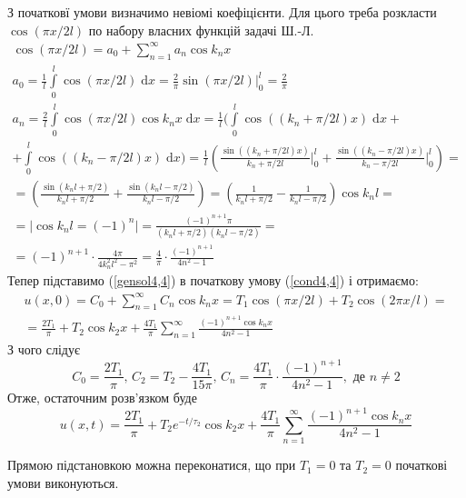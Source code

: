 З початковї умови визначимо невіомі коефіцієнти. Для цього треба розкласти $\cos(\pi x/2l)$ по набору власних функцій задачі Ш.-Л. 
\begin{equation*}
    \begin{gathered}
        \cos(\pi x/2l) = a_0 + \sum_{n=1}^{\infty} a_n \cos k_nx \\
        a_0 = \frac{1}{l}\int\limits_0^l \cos(\pi x/2l) \;\mathrm{d}x = \frac{2}{\pi} \sin(\pi x/2l) \bigg|_0^l = \frac{2}{\pi}\\
        a_n = \frac{2}{l}\int\limits_0^l \cos(\pi x/2l)\cos k_nx \;\mathrm{d}x = \frac{1}{l}\bigg(\int\limits_0^l \cos((k_n + \pi/2l)x) \;\mathrm{d}x +\\
        + \int\limits_0^l \cos((k_n - \pi/2l)x) \;\mathrm{d}x\bigg) = \frac{1}{l}\left(\frac{\sin((k_n + \pi/2l)x)}{k_n + \pi/2l}\bigg|_0^l + \frac{\sin((k_n - \pi/2l)x)}{k_n - \pi/2l}\bigg|_0^l\right) =\\
        = \left(\frac{\sin(k_nl + \pi/2)}{k_nl + \pi/2} + \frac{\sin(k_nl - \pi/2)}{k_nl - \pi/2}\right) = \left(\frac{1}{k_nl + \pi/2} - \frac{1}{k_nl - \pi/2}\right)\cos k_nl =\\
        = \big|\cos k_nl = (-1)^n\big| = \frac{(-1)^{n+1} \pi}{(k_nl + \pi/2)(k_nl - \pi/2)} =\\
        = (-1)^{n+1} \cdot \frac{4\pi}{4k_n^2l^2 - \pi^2} = \frac{4}{\pi} \cdot \frac{(-1)^{n+1}}{4n^2 - 1}
    \end{gathered}
\end{equation*}
Тепер підставимо (\ref{gensol4,4}) в початкову умову (\ref{cond4,4}) і отримаємо:
\begin{equation}
    \begin{gathered}
        u(x,0) = C_0 + \sum_{n=1}^{\infty}C_n \cos k_n x = T_1 \cos(\pi x/2l) + T_2 \cos(2\pi x/l) =\\
        = \frac{2T_1}{\pi} + T_2 \cos k_2x + \frac{4T_1}{\pi} \sum_{n=1}^{\infty} \frac{(-1)^{n+1} \cos k_nx}{4n^2 - 1}
    \end{gathered}
\end{equation} 
З чого слідує 
\begin{equation*}
    C_0 = \frac{2T_1}{\pi},\, C_2 = T_2 - \frac{4T_1}{15\pi},\, C_n = \frac{4T_1}{\pi} \cdot \frac{(-1)^{n+1}}{4n^2 - 1}, \text{ де } n \neq 2
\end{equation*}
Отже, остаточним розв'язком буде 
\begin{equation}
    u(x,t) = \frac{2T_1}{\pi} + T_2 e^{-t/\tau_2}\cos k_2x + \frac{4T_1}{\pi} \sum_{n=1}^{\infty} \frac{(-1)^{n+1} \cos k_nx}{4n^2 - 1}
\end{equation}

Прямою підстановкою можна переконатися, що при $T_1 = 0$ та $T_2 = 0$ початкові умови виконуються.

%